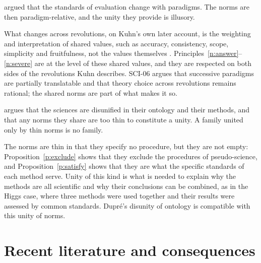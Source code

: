 \documentclass{situationist-preprint}
\begin{document}
\begin{objection}
\citet{Kuhn1962} argued that the standards of evaluation change with paradigms. The norms are then paradigm-relative, and the unity they provide is illusory.
\end{objection}

\begin{reply}
What changes across revolutions, on Kuhn's own later account, is the weighting and interpretation of shared values, such as accuracy, consistency, scope, simplicity and fruitfulness, not the values themselves \citep{Kuhn1977}. Principles~\ref{n:answer}--\ref{n:severe} are at the level of these shared values, and they are respected on both sides of the revolutions Kuhn describes. SCI-06 argues that successive paradigms are partially translatable and that theory choice across revolutions remains rational; the shared norms are part of what makes it so.
\end{reply}

\begin{objection}[Disunity]
\citet{Dupre1993} argues that the sciences are disunified in their ontology and their methods, and that any norms they share are too thin to constitute a unity. A family united only by thin norms is no family.
\end{objection}

\begin{reply}
The norms are thin in that they specify no procedure, but they are not empty: Proposition~\ref{p:exclude} shows that they exclude the procedures of pseudo-science, and Proposition~\ref{p:satisfy} shows that they are what the specific standards of each method serve. Unity of this kind is what is needed to explain why the methods are all scientific and why their conclusions can be combined, as in the Higgs case, where three methods were used together and their results were assessed by common standards. Dupré's disunity of ontology is compatible with this unity of norms.
\end{reply}

\section{Recent literature and consequences}
\end{document}
